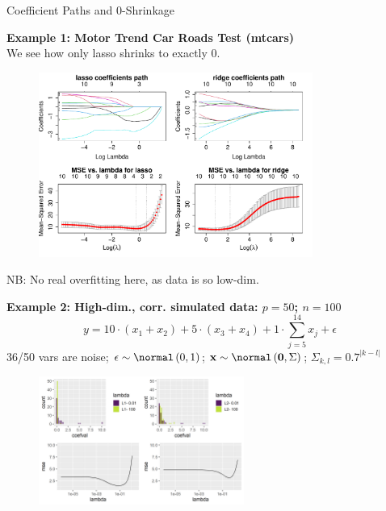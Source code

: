 \documentclass[11pt,compress,t,notes=noshow, xcolor=table]{beamer}
\begin{document}
\begin{vbframe}{Coefficient Paths and 0-Shrinkage}

\textbf{Example 1: Motor Trend Car Roads Test (mtcars)} \\

We see how only lasso shrinks to exactly 0.

\begin{figure}
\includegraphics[width=0.8\textwidth]{figure_man/l1_l2_regupaths_mse.pdf}\\
\end{figure}
\vspace{-0.3cm}
NB: No real overfitting here, as data is so low-dim.

\framebreak
\textbf{Example 2: High-dim., corr. simulated data: $p=50$; $n=100$}
$$ y = 10 \cdot (x_1 + x_2) + 5 \cdot (x_3 + x_4) + 1 \cdot \sum_{j = 5}^{14} x_j + \epsilon $$
36/50 vars are noise; $\epsilon \sim \normal \left(0, 1\right)$; $\xv \sim \normal \left(\mathbf{0}, \Sigma \right)$; 
$\Sigma_{k,l}=0.7^{|k-l|}$ 



\begin{figure}
\includegraphics[width=0.6\textwidth]{figure/shrinkage_2.png}\\
\end{figure}

\end{vbframe}
\end{document}
